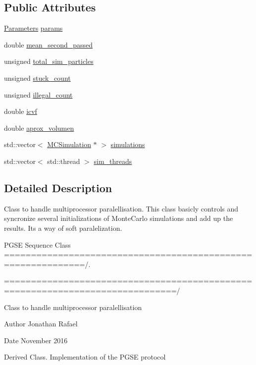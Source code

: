 \subsection*{Public Attributes}
\begin{DoxyCompactItemize}
\item 
\hyperlink{class_parameters}{Parameters} \hyperlink{class_parallel_m_c_simulation_a83f856aaa88a403c657c7b8234deee7a}{params}
\item 
double \hyperlink{class_parallel_m_c_simulation_ad122df5454bb26a56e89c9077560a33d}{mean\+\_\+second\+\_\+passed}
\item 
unsigned \hyperlink{class_parallel_m_c_simulation_a18326e05c32fac82264d7351d78a7433}{total\+\_\+sim\+\_\+particles}
\item 
unsigned \hyperlink{class_parallel_m_c_simulation_a6ee1dfd6e695ec5ec7d4c2ed94f233cf}{stuck\+\_\+count}
\item 
unsigned \hyperlink{class_parallel_m_c_simulation_ae667ec358689a3a7b42876b401a5fce5}{illegal\+\_\+count}
\item 
double \hyperlink{class_parallel_m_c_simulation_a871e3fdace01984a533792dd49bebd1b}{icvf}
\item 
double \hyperlink{class_parallel_m_c_simulation_aa51edc0c79c6ae66ddd0046d21b871d4}{aprox\+\_\+volumen}
\item 
std\+::vector$<$ \hyperlink{class_m_c_simulation}{M\+C\+Simulation} $\ast$ $>$ \hyperlink{class_parallel_m_c_simulation_af16d292f007b8391122a035022422ed5}{simulations}
\item 
std\+::vector$<$ std\+::thread $>$ \hyperlink{class_parallel_m_c_simulation_a2a0f1cc2812c1a35e5e38d9d9ddde78b}{sim\+\_\+threads}
\end{DoxyCompactItemize}


\subsection{Detailed Description}
Class to handle multiprocessor paralellisation. This class basicly controls and syncronize several initializations of Monte\+Carlo simulations and add up the results. It\textquotesingle{}s a way of soft paralelization. 

P\+G\+SE Sequence Class =============================================================/.

==============================================================================/

Class to handle multiprocessor paralellisation \begin{DoxyAuthor}{Author}
Jonathan Rafael 
\end{DoxyAuthor}
\begin{DoxyDate}{Date}
November 2016 


\end{DoxyDate}
Derived Class. Implementation of the P\+G\+SE protocol

